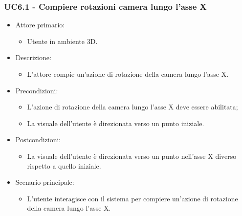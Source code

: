 \subsubsection{UC6.1 - Compiere rotazioni camera lungo l'asse X}
\begin{itemize}

	\item Attore primario: 
	\begin{itemize}
		\item Utente in ambiente 3D.
	\end{itemize}
	\item Descrizione:
	\begin{itemize}
		\item L'attore compie un'azione di rotazione della camera lungo l'asse X.
	\end{itemize}
	
	\item Precondizioni:
	\begin{itemize}
		\item L'azione di rotazione della camera lungo l'asse X deve essere abilitata;
		\item La visuale dell'utente è direzionata verso un punto iniziale.
	\end{itemize}
	
	\item Postcondizioni:
	\begin{itemize}
		\item La visuale dell'utente è direzionata verso un punto nell'asse X diverso rispetto a quello iniziale.
	\end{itemize}
	
	\item Scenario principale:
	\begin{itemize}
		\item L'utente interagisce con il sistema per compiere un'azione di rotazione della camera lungo l'asse X.
	\end{itemize}
	
\end{itemize}

